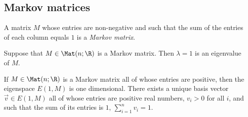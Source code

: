 \documentclass{article}
\begin{document}
\subsection{Markov matrices}

\begin{definition}
	A matrix $M$ whose entries are non-negative and such that the sum of the entries of each
	column equals $1$ is a \emph{Markov matrix}.
\end{definition}

\begin{lemma}[Notes 4.7.6]
	Suppose that $M\in\Mat(n;\R)$ is a Markov matrix. Then $\lambda=1$ is an eigenvalue of $M$.
\end{lemma}

\begin{theorem}[Perron]
	If $M\in\Mat(n;\R)$ is a Markov matrix all of whose entries are positive, then the eigenspace
	$E(1,M)$ is one dimensional. There exists a unique basis vector $\vec v\in E(1,M)$ all of whose
	entries are positive real numbers, $v_i>0$ for all $i$, and such that the sum of its entries is $1$,
	$\sum_{i=1}^n v_i=1$.
\end{theorem}
\end{document}
